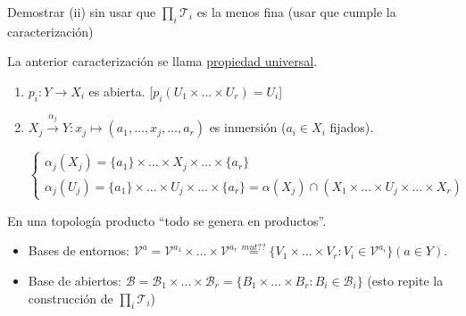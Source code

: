 \begin{ej}
Demostrar (ii) sin usar que $\prod_{i} \mathcal{T}_i$ es la menos fina (usar que cumple la caracterización)
\end{ej}

La anterior caracterización se llama \underline{propiedad universal}.

\begin{prop}
\begin{enumerate}
    \item $p_i: Y \rightarrow X_i$ es abierta. [$p_i\left( U_1 \times \ldots \times U_r \right) = U_i$]
    \item $X_j \xrightarrow{\alpha_j} Y: x_j \mapsto \left( a_1, \ldots, x_j, \ldots, a_r \right)$ es inmersión ($a_i \in X_i$ fijados).
    \begin{demo}      
    \[
    \begin{cases}
        \alpha_j\left( X_j \right) = \{a_1\} \times \ldots \times X_j \times \ldots \times \{a_r\} \\
        \alpha_j\left( U_j \right) = \{a_1\} \times \ldots \times U_j \times \ldots \times \{a_r\} = \alpha\left( X_j \right) \cap \left( X_1 \times \ldots \times U_j \times \ldots \times X_r \right) 
    \end{cases}
    \]
    \end{demo}
\end{enumerate}
\end{prop}

\begin{pg}
En una topología producto ``todo se genera en productos''.
\begin{ej}
\begin{itemize}
    \item Bases de entornos: $\mathcal{V}^a = \mathcal{V}^{a_1} \times \ldots \times \mathcal{V}^{a_r} \stackrel{mut??}{=} \{V_1 \times \ldots \times V_r: V_i \in \mathcal{V}^{a_i}\} \left( a \in Y \right)$.
    \item Base de abiertos: $\mathcal{B} = \mathcal{B}_1 \times \ldots \times \mathcal{B}_r = \{B_1 \times \ldots \times B_r: B_i \in \mathcal{B}_i\}$ (esto repite la construcción de $\prod_{i} \mathcal{T}_i$)
\end{itemize}
\end{ej}
\end{pg}


